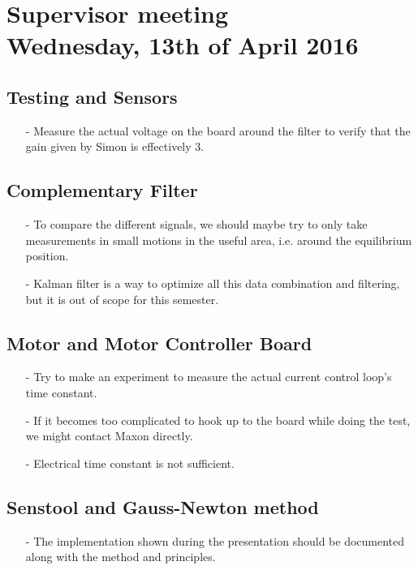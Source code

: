 

\renewcommand\chaptername{KAPITEL}
\renewcommand\contentsname{Indhold}
\renewcommand\figurename{Figur}
\renewcommand\tablename{Tabel}

\section*{Supervisor meeting\\ \small Wednesday, 13th of April 2016}

\subsection{Testing and Sensors}
\begin{itemize}
  \item[-] Measure the actual voltage on the board around the filter to verify that the gain given by Simon is effectively 3.
\end{itemize}

\subsection{Complementary Filter}
\begin{itemize}
  \item[-] To compare the different signals, we should maybe try to only take measurements in small motions in the useful area, i.e. around the equilibrium position.
  \item[-] Kalman filter is a way to optimize all this data combination and filtering, but it is out of scope for this semester.
\end{itemize}

\subsection{Motor and Motor Controller Board}
\begin{itemize}
  \item[-] Try to make an experiment to measure the actual current control loop's time constant.
  \item[-] If it becomes too complicated to hook up to the board while doing the test, we might contact Maxon directly.
  \item[-] Electrical time constant is not sufficient.
\end{itemize}

\subsection{Senstool and Gauss-Newton method}
\begin{itemize}
  \item[-] The implementation shown during the presentation should be documented along with the method and principles.
\end{itemize}

